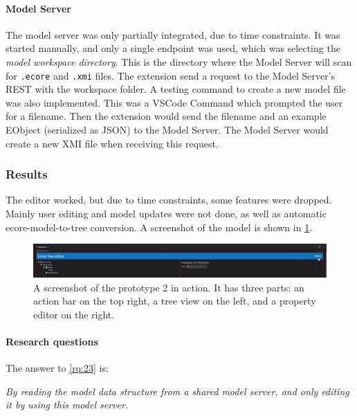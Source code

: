 


\paragraph*{Model Server}
The model server was only partially integrated, due to time constraints.
It was started manually, and only a single endpoint was used, which was selecting the \emph{model workspace directory}.
This is the directory where the Model Server will scan for \texttt{.ecore} and \texttt{.xmi} files.
The extension send a request to the Model Server's \gls{REST}  with the workspace folder.
A testing command to create a new model file was also implemented.
This was a VSCode Command which prompted the user for a filename.
Then the extension would send the filename and an example EObject (serialized as \gls{JSON}) to the Model Server.
The Model Server would create a new \gls{XMI} file when receiving this request.


\subsubsection{Results}
The editor worked, but due to time constraints, some features were dropped.
Mainly user editing and model updates were not done, as well as automatic ecore-model-to-tree conversion.
A screenshot of the model is shown in \cref{fig:prototype-2-screenshot}.

\begin{figure}[htbp]
  \centering
  \includegraphics[width=\textwidth]{figures/prototype-2-screenshot.png}
  \caption[Prototype 2 Screenshot]{A screenshot of the prototype 2 in action. It has three parts: an action bar on the top right, a tree view on the left, and a property editor on the right.}\label{fig:prototype-2-screenshot}
\end{figure}

\paragraph*{Research questions}
The answer to \cref{rq:23} is:
\begin{displayquote}
  \emph{By reading the model data structure from a shared model server, and only editing it by using this model server.}
\end{displayquote}

